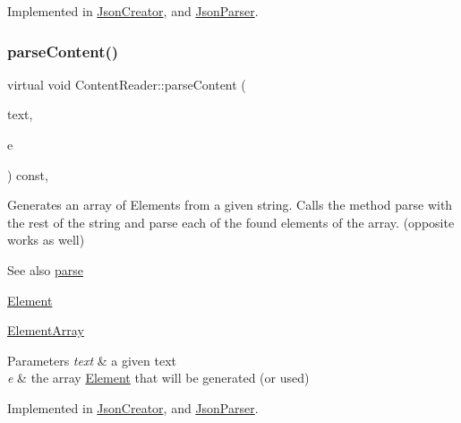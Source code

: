 Implemented in \mbox{\hyperlink{classJsonCreator_a95fb65046a7467b8e48feaf92a62b40c}{Json\+Creator}}, and \mbox{\hyperlink{classJsonParser_a0857f5d286e5f0b973e2791e5e7a4e83}{Json\+Parser}}.

\mbox{\label{classContentReader_a91fdd738983dcc7a246c3c163007dfa9}} 
\subsubsection{\texorpdfstring{parse\+Content()}{parseContent()}\hspace{0.1cm}{\footnotesize\ttfamily [4/6]}}
{\footnotesize\ttfamily virtual void Content\+Reader\+::parse\+Content (\begin{DoxyParamCaption}\item[{std\+::string \&}]{text,  }\item[{\mbox{\hyperlink{classElementArray}{Element\+Array}} $\ast$}]{e }\end{DoxyParamCaption}) const\hspace{0.3cm}{\ttfamily [pure virtual]}, {\ttfamily [inherited]}}

Generates an array of Elements from a given string. Calls the method parse with the rest of the string and parse each of the found elements of the array. (opposite works as well) \begin{DoxySeeAlso}{See also}
\mbox{\hyperlink{classContentReader_a7fff2e63a2e8fa216665604f69974e1d}{parse}} 

\mbox{\hyperlink{classElement}{Element}} 

\mbox{\hyperlink{classElementArray}{Element\+Array}}
\end{DoxySeeAlso}

\begin{DoxyParams}{Parameters}
{\em text} & a given text \\
\hline
{\em e} & the array \mbox{\hyperlink{classElement}{Element}} that will be generated (or used) \\
\hline
\end{DoxyParams}


Implemented in \mbox{\hyperlink{classJsonCreator_a694669d359eb73890a9e9f247c4ebab4}{Json\+Creator}}, and \mbox{\hyperlink{classJsonParser_aa728c443b247b83cdf6cedb406d8940d}{Json\+Parser}}.

\mbox{\label{classContentReader_a59a8de2bf3436e46b4d029a9b3c3c9da}} 
